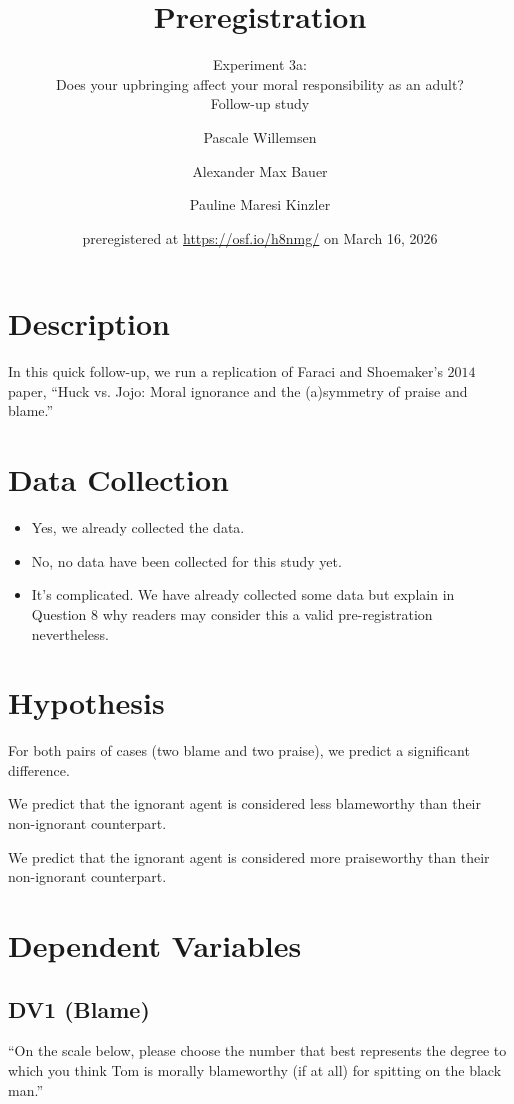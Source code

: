 \documentclass[scrarticle]{scrartcl}
\title{Preregistration}
\subtitle{Experiment 3a:\\Does your upbringing affect your moral responsibility as an adult?\\Follow-up study}
\author[1]{Pascale Willemsen}
\author[2]{Alexander Max Bauer}
\author[1]{Pauline Maresi Kinzler }
\affil[1]{ University of Zurich}
\affil[2]{ Carl von Ossietzky University of Oldenburg}
\date{\small preregistered at \url{https://osf.io/h8nmg/} on March 16, 2026}
\begin{document}
\maketitle


\clearpage
\section{Description}
In this quick follow-up, we run a replication of Faraci and Shoemaker's $2014$ paper, \enquote{Huck vs. Jojo: Moral ignorance and the (a)symmetry of praise and blame.}


\section{Data Collection}
\begin{itemize}[label=\Square,noitemsep]
   \item Yes, we already collected the data.
   \item[\XBox] No, no data have been collected for this study yet.
   \item It's complicated. We have already collected some data but explain in Question $8$ why readers may consider this a valid pre-registration nevertheless.
\end{itemize}


\section{Hypothesis}
For both pairs of cases (two blame and two praise), we predict a significant difference.

We predict that the ignorant agent is considered less blameworthy than their non-ignorant counterpart.

We predict that the ignorant agent is considered more praiseworthy than their non-ignorant counterpart.


\section{Dependent Variables}


\subsection*{DV1 (Blame)}
\enquote{On the scale below, please choose the number that best represents the degree to which you think Tom is morally blameworthy (if at all) for spitting on the black man.}
\end{document}
